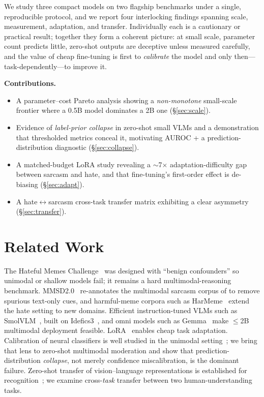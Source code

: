 \documentclass[sigconf,nonacm]{acmart}
\begin{document}
We study three compact models on two flagship benchmarks under a single, reproducible
protocol, and we report four interlocking findings spanning scale, measurement,
adaptation, and transfer. Individually each is a cautionary or practical result;
together they form a coherent picture: at small scale, parameter count predicts little,
zero-shot outputs are deceptive unless measured carefully, and the value of cheap
fine-tuning is first to \emph{calibrate} the model and only then---task-dependently---to
improve it.

\noindent\textbf{Contributions.}
\begin{itemize}
\item A parameter--cost Pareto analysis showing a \emph{non-monotone} small-scale
frontier where a 0.5B model dominates a 2B one (\S\ref{sec:scale}).
\item Evidence of \emph{label-prior collapse} in zero-shot small VLMs and a demonstration
that thresholded metrics conceal it, motivating AUROC + a prediction-distribution
diagnostic (\S\ref{sec:collapse}).
\item A matched-budget LoRA study revealing a $\sim$7$\times$ adaptation-difficulty gap
between sarcasm and hate, and that fine-tuning's first-order effect is de-biasing
(\S\ref{sec:adapt}).
\item A hate$\leftrightarrow$sarcasm cross-task transfer matrix exhibiting a clear
asymmetry (\S\ref{sec:transfer}).
\end{itemize}

\section{Related Work}
The Hateful Memes Challenge~\cite{kiela2020hateful} was designed with ``benign
confounders'' so unimodal or shallow models fail; it remains a hard multimodal-reasoning
benchmark. MMSD2.0~\cite{qin2023mmsd2} re-annotates the multimodal sarcasm corpus of
\citet{cai2019multimodal} to remove spurious text-only cues, and harmful-meme corpora such
as HarMeme~\cite{pramanick2021harmeme} extend the hate setting to new domains. Efficient
instruction-tuned VLMs such as SmolVLM~\cite{marafioti2025smolvlm}, built on
Idefics3~\cite{laurencon2024idefics3}, and omni models such as Gemma~\cite{gemma2025} make
$\leq$2B multimodal deployment feasible. LoRA~\cite{hu2022lora} enables cheap
task adaptation. Calibration of neural classifiers is well studied in the unimodal
setting~\cite{guo2017calibration}; we bring that lens to zero-shot multimodal moderation
and show that prediction-distribution \emph{collapse}, not merely confidence
miscalibration, is the dominant failure. Zero-shot transfer of vision--language
representations is established for recognition~\cite{radford2021clip}; we examine
cross-\emph{task} transfer between two human-understanding tasks.
\end{document}
